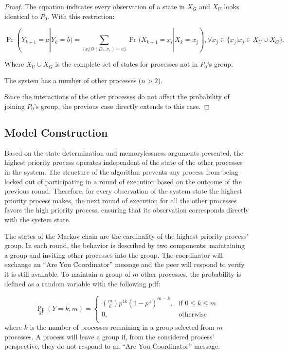 \begin{proof}
The equation indicates every observation of a state in $X_G$ and $X_U$ looks identical to $P_0$.
With this restriction:

\begin{equation}
    \Pr(Y_{k+1}=a | Y_{k}=b) = \sum_{\{x_{i} | O(D_0, x_{i}) = a\}} \Pr(X_{k+1}=x_i | X_{k}=x_j), \forall x_j \in \{x_j | x_j \in X_U \cup X_G\}.
\end{equation}

Where $X_U \cup X_G$ is the complete set of states for processes not in $P_0$'s group.

\begin{case}
    The system has a number of other processes ($n > 2$).
\end{case}

Since the interactions of the other processes do not affect the probability of joining $P_0$'s group, the previous case directly extends to this case.

\end{proof}

\subsection{Model Construction}

Based on the state determination and memorylessness arguments presented, the highest priority process operates independent of the state of the other processes in the system.
The structure of the algorithm prevents any process from being locked out of participating in a round of execution based on the outcome of the previous round.
Therefore, for every observation of the system state the highest priority process makes, the next round of execution for all the other processes favors the high priority process, ensuring that its observation corresponds directly with the system state.

The states of the Markov chain are the cardinality of the highest priority process' group.
In each round, the behavior is described by two components: maintaining a group and inviting other processes into the group.
The coordinator will exchange an ``Are You Coordinator'' message and the peer will respond to verify it is still available.
To maintain a group of $m$ other processes, the probability is defined as a random variable with the following \ac{pdf}:

\begin{equation}
 \Pr_{M}(Y=k; m) =
   \begin{cases}
    \binom{m}{k} p^{4k}(1-p^4)^{m-k}, & \text{if } 0 \leq k \leq m \\
    0,                                & \text{otherwise} \\
  \end{cases}
\end{equation}%
where $k$ is the number of processes remaining in a group selected from $m$ processes.
A process will leave a group if, from the considered process' perspective, they do not respond to an ``Are You Coordinator'' message.

